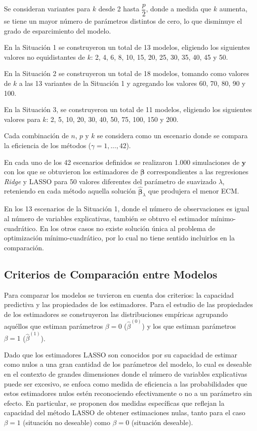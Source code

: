 \documentclass[a4paper,12pt]{report}
\begin{document}
Se consideran variantes para $k$ desde 2 hasta $\dfrac{p}{2}$, donde a medida que $k$ aumenta, se tiene un mayor número de parámetros distintos de cero, lo que disminuye el grado de esparcimiento del modelo.

En la Situación 1 se construyeron un total de 13 modelos, eligiendo los siguientes valores no equidistantes de $k$: 2, 4, 6, 8, 10, 15, 20, 25, 30, 35, 40, 45 y 50.

En la Situación 2 se construyeron un total de 18 modelos, tomando como valores de $k$ a las 13 variantes de la Situación 1 y agregando los valores 60, 70, 80, 90 y 100.

En la Situación 3, se construyeron un total de 11 modelos, eligiendo los siguientes valores para $k$: 2, 5, 10, 20, 30, 40, 50, 75, 100, 150 y 200.

Cada combinación de $n$, $p$ y $k$ se considera como un escenario donde se compara la eficiencia de los métodos ($\gamma=1,...,42$).

En cada uno de los 42 escenarios definidos se realizaron 1.000 simulaciones de $\boldsymbol{y}$ con los que se obtuvieron los estimadores de $\boldsymbol{\beta}$ correspondientes a las regresiones \textit{Ridge} y LASSO para 50 valores diferentes del parámetro de suavizado $\lambda$, reteniendo en cada método aquella solución $\boldsymbol{\hat{\beta}}_\lambda$ que produjera el menor ECM. 

En los 13 escenarios de la Situación 1, donde el número de observaciones es igual al número de variables explicativas, también se obtuvo el estimador mínimo-cuadrático. En los otros casos no existe solución única al problema de optimización mínimo-cuadrático, por lo cual no tiene sentido incluirlos en la comparación.

\subsection{Criterios de Comparación entre Modelos}
Para comparar los modelos se tuvieron en cuenta dos criterios: la capacidad predictiva y las propiedades de los estimadores. Para el estudio de las propiedades de los estimadores se construyeron las distribuciones empíricas agrupando aquéllos que estiman parámetros $\beta=0$ ($\hat{\beta}^{(0)}$) y los que estiman parámetros $\beta=1$ ($\hat{\beta}^{(1)}$).

Dado que los estimadores LASSO son conocidos por su capacidad de estimar como nulos a una gran cantidad de los parámetros del modelo, lo cual es deseable en el contexto de grandes dimensiones donde el número de variables explicativas puede ser excesivo, se enfoca como medida de eficiencia a las probabilidades que estos estimadores nulos estén reconociendo efectivamente o no a un parámetro sin efecto. En particular, se proponen dos medidas específicas que reflejan la capacidad del método LASSO de obtener estimaciones nulas, tanto para el caso $\beta = 1$ (situación no deseable) como $\beta = 0$ (situación deseable).
\end{document}
